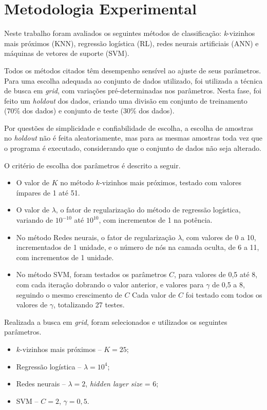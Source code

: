 \documentclass[10pt, conference, compsocconf]{IEEEtran}
\begin{document}
\section{Metodologia Experimental}
Neste trabalho foram avaliados os seguintes métodos de classificação: \textit{k}-vizinhos mais próximos (KNN), regressão logística (RL), redes neurais artificiais (ANN) e máquinas de vetores de suporte (SVM).

Todos os métodos citados têm desempenho sensível ao ajuste de seus parâmetros. Para uma escolha adequada ao conjunto de dados utilizado, foi utilizada a técnica de busca em \textit{grid}, com variações pré-determinadas nos parâmetros. Nesta fase, foi feito um \textit{holdout} dos dados, criando uma divisão em conjunto de treinamento (70\% dos dados) e conjunto de teste (30\% dos dados). 

Por questões de simplicidade e confiabilidade de escolha, a escolha de amostras no \textit{holdout} não é feita aleatoriamente, mas para as mesmas amostras toda vez que o programa é executado, considerando que o conjunto de dados não seja alterado.

O critério de escolha dos parâmetros é descrito a seguir.

\begin{itemize}
\item O valor de $K$ no método $k$-vizinhos mais próximos, testado com valores ímpares de 1 até 51.
\item O valor de $\lambda$, o fator de regularização do método de regressão logística, variando de $10^{-10}$ até $10^{10}$, com incrementos de 1 na potência.
\item No método Redes neurais, o fator de regularização $\lambda$, com valores de 0 a 10, incrementados de 1 unidade, e o número de nós na camada oculta, de 6 a 11, com incrementos de 1 unidade.
\item No método SVM, foram testados os parâmetros $C$, para valores de 0,5 até 8, com cada iteração dobrando o valor anterior, e valores para $\gamma$ de 0,5 a 8, seguindo o mesmo crescimento de $C$ Cada valor de $C$ foi testado com todos os valores de $\gamma$, totalizando 27 testes.
\end{itemize}

Realizada a busca em \textit{grid}, foram selecionados e utilizados os seguintes parâmetros.

\begin{itemize}
\item $k$-vizinhos mais próximos -- $K = 25$;
\item Regressão logística -- $\lambda = 10^{4}$;
\item Redes neurais -- $\lambda = 2$, \textit{hidden layer size} = 6;
\item SVM -- $C = 2$, $\gamma = 0,5$.
\end{itemize}
\end{document}
